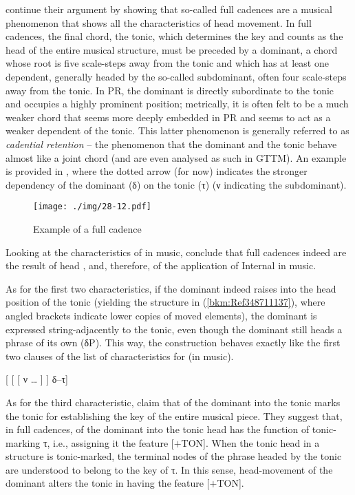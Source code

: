 \documentclass[output=paper]{langsci/langscibook}
\begin{document}
\citeauthor{KatzPes2011} continue their argument by showing that so-called full
cadences are a musical phenomenon that shows all the characteristics of head
movement. In full cadences, the final chord, the tonic, which determines the
key and counts as the head of the entire musical structure, must be preceded by
a dominant, a chord whose root is five scale-steps away from the tonic and
which has at least one dependent, generally headed by the so-called
subdominant, often four scale-steps away from the tonic. In \gls{PR}, the
dominant is directly subordinate to the tonic and occupies a highly prominent
position; metrically, it is often felt to be a much weaker chord that seems
more deeply embedded in \gls{PR} and seems to act as a weaker dependent of the
tonic. This latter phenomenon is generally referred to as \emph{cadential
retention} – the phenomenon that the dominant and the tonic behave almost like
a joint chord (and are even analysed as such in GTTM). An example is provided
in , where the dotted arrow (for now) indicates
the stronger dependency of the dominant (δ) on the tonic (τ) (ν indicating the
subdominant).

\begin{figure}
    \caption{\label{bkm:Ref348897627}Example of a full cadence \parencite[44]{KatzPes2011}}
    \texttt{[image: ./img/28-12.pdf]}
\end{figure}

Looking at the characteristics of  in music,
\citeauthor{KatzPes2011} conclude that full cadences indeed are the result of
head , and, therefore, of the application of Internal  in
music.

As for the first two characteristics, if the dominant indeed raises into the
head position of the tonic (yielding the structure in (\ref{bkm:Ref348711137}),
where angled brackets indicate lower copies of moved elements), the dominant is
expressed string-adjacently to the tonic, even though the dominant still heads
a phrase of its own (δP). This way, the construction behaves exactly like the
first two clauses of the list of characteristics for  (in music).

\ea\label{bkm:Ref348711137}
    {}[ [ [ ν \dots{} ]  ] δ–τ]
\z

As for the third characteristic, \citeauthor{KatzPes2011} claim that 
of the dominant into the tonic marks the tonic for establishing the key of the
entire musical piece. They suggest that, in full cadences,  of the
dominant into the tonic head has the function of tonic-marking τ, i.e.,
assigning it the feature [$+$TON]. When the tonic head in a structure is
tonic-marked, the terminal nodes of the phrase headed by the tonic are
understood to belong to the key of τ. In this sense, head-movement of the
dominant alters the tonic in having the feature [$+$TON].
\end{document}
